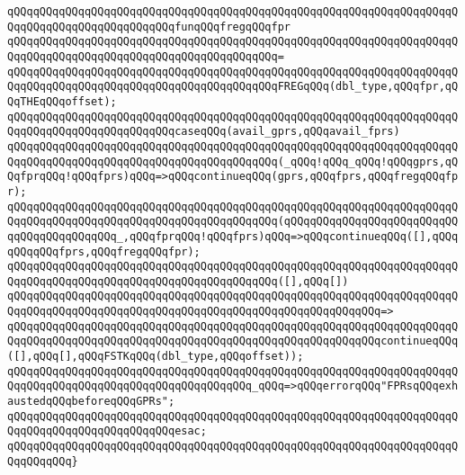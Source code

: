 \newline
\verb|qQQqqQQqqQQqqQQqqQQqqQQqqQQqqQQqqQQqqQQqqQQqqQQqqQQqqQQqqQQqqQQqqQQqqQQqqQQqqQQqqQQqqQQqqQQqqQQqfunqQQqfregqQQqfpr|\newline
\verb|qQQqqQQqqQQqqQQqqQQqqQQqqQQqqQQqqQQqqQQqqQQqqQQqqQQqqQQqqQQqqQQqqQQqqQQqqQQqqQQqqQQqqQQqqQQqqQQqqQQqqQQqqQQqqQQq=|\newline
\verb|qQQqqQQqqQQqqQQqqQQqqQQqqQQqqQQqqQQqqQQqqQQqqQQqqQQqqQQqqQQqqQQqqQQqqQQqqQQqqQQqqQQqqQQqqQQqqQQqqQQqqQQqqQQqqQQqFREGqQQq(dbl_type,qQQqfpr,qQQqTHEqQQqoffset);|\newline
\newline
\verb|qQQqqQQqqQQqqQQqqQQqqQQqqQQqqQQqqQQqqQQqqQQqqQQqqQQqqQQqqQQqqQQqqQQqqQQqqQQqqQQqqQQqqQQqqQQqqQQqcaseqQQq(avail_gprs,qQQqavail_fprs)|\newline
\newline
\verb|qQQqqQQqqQQqqQQqqQQqqQQqqQQqqQQqqQQqqQQqqQQqqQQqqQQqqQQqqQQqqQQqqQQqqQQqqQQqqQQqqQQqqQQqqQQqqQQqqQQqqQQqqQQqqQQq(_qQQq!qQQq_qQQq!qQQqgprs,qQQqfprqQQq!qQQqfprs)qQQq=>qQQqcontinueqQQq(gprs,qQQqfprs,qQQqfregqQQqfpr);|\newline
\verb|qQQqqQQqqQQqqQQqqQQqqQQqqQQqqQQqqQQqqQQqqQQqqQQqqQQqqQQqqQQqqQQqqQQqqQQqqQQqqQQqqQQqqQQqqQQqqQQqqQQqqQQqqQQqqQQq(qQQqqQQqqQQqqQQqqQQqqQQqqQQqqQQqqQQqqQQqqQQq_,qQQqfprqQQq!qQQqfprs)qQQq=>qQQqcontinueqQQq([],qQQqqQQqqQQqfprs,qQQqfregqQQqfpr);|\newline
\newline
\verb|qQQqqQQqqQQqqQQqqQQqqQQqqQQqqQQqqQQqqQQqqQQqqQQqqQQqqQQqqQQqqQQqqQQqqQQqqQQqqQQqqQQqqQQqqQQqqQQqqQQqqQQqqQQqqQQq([],qQQq[])|\newline
\verb|qQQqqQQqqQQqqQQqqQQqqQQqqQQqqQQqqQQqqQQqqQQqqQQqqQQqqQQqqQQqqQQqqQQqqQQqqQQqqQQqqQQqqQQqqQQqqQQqqQQqqQQqqQQqqQQqqQQqqQQqqQQqqQQq=>|\newline
\verb|qQQqqQQqqQQqqQQqqQQqqQQqqQQqqQQqqQQqqQQqqQQqqQQqqQQqqQQqqQQqqQQqqQQqqQQqqQQqqQQqqQQqqQQqqQQqqQQqqQQqqQQqqQQqqQQqqQQqqQQqqQQqqQQqcontinueqQQq([],qQQq[],qQQqFSTKqQQq(dbl_type,qQQqoffset));|\newline
\newline
\verb|qQQqqQQqqQQqqQQqqQQqqQQqqQQqqQQqqQQqqQQqqQQqqQQqqQQqqQQqqQQqqQQqqQQqqQQqqQQqqQQqqQQqqQQqqQQqqQQqqQQqqQQqqQQq_qQQq=>qQQqerrorqQQq"FPRsqQQqexhaustedqQQqbeforeqQQqGPRs";|\newline
\verb|qQQqqQQqqQQqqQQqqQQqqQQqqQQqqQQqqQQqqQQqqQQqqQQqqQQqqQQqqQQqqQQqqQQqqQQqqQQqqQQqqQQqqQQqqQQqqQQqesac;|\newline
\verb|qQQqqQQqqQQqqQQqqQQqqQQqqQQqqQQqqQQqqQQqqQQqqQQqqQQqqQQqqQQqqQQqqQQqqQQqqQQqqQQq}|\newline
